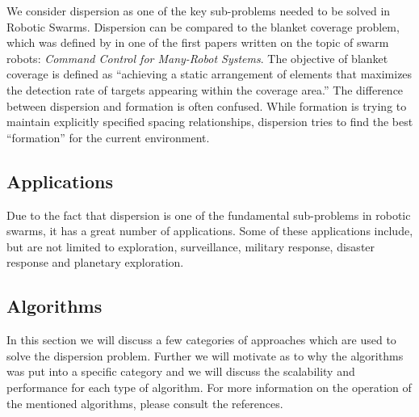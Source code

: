 We consider dispersion as one of the key sub-problems needed to be solved in Robotic Swarms.\cite{ugur2007dispersion,mclurkin2007distributed,ludwig2006robotic} Dispersion can be compared to the blanket coverage problem, which was defined by in one of the first papers written on the topic of swarm robots: \emph{Command Control for Many-Robot Systems}.\cite{gage1992command} The objective of blanket coverage is defined as ``achieving a static arrangement of elements that maximizes the detection rate of targets appearing within the coverage area.''\cite{gage1992command} The difference between dispersion and formation is often confused. While formation is trying to maintain explicitly specified spacing relationships, dispersion tries to find the best ``formation'' for the current environment. 

\subsection{Applications}
Due to the fact that dispersion is one of the fundamental sub-problems in robotic swarms, it has a great number of applications.
Some of these applications include, but are not limited to exploration, surveillance, military response, disaster response and planetary exploration.\cite{ludwig2006robotic,Penders2011,mclurkin2007distributed} 

\subsection{Algorithms}
In this section we will discuss a few categories of approaches which are used to solve the dispersion problem.
Further we will motivate as to why the algorithms was put into a specific category and we will discuss the scalability and performance for each type of algorithm.
For more information on the operation of the mentioned algorithms, please consult the references.

